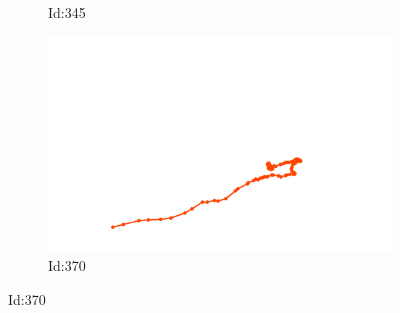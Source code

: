 \documentclass[12pt,twoside]{report}
\begin{document}
\begin{figure}
\begin{subfigure}[b]{0.20\textwidth}
\caption{Id:345}
\end{subfigure}
\begin{subfigure}[b]{0.20\textwidth}
\centering
\includegraphics[width=\textwidth]{../../trajectories/370.png}
\caption{Id:370}
\end{subfigure}
\end{figure}
\end{document}
